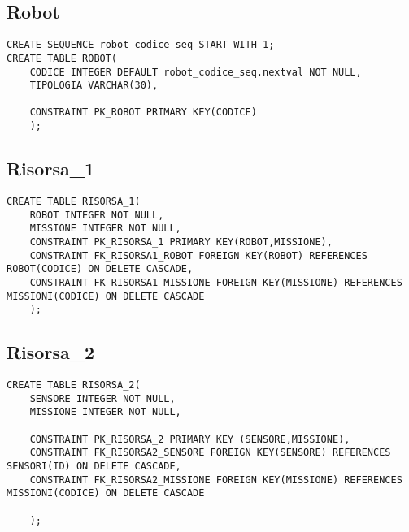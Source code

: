 \begin{description}
\subsection{Robot}
\begin{verbatim}
CREATE SEQUENCE robot_codice_seq START WITH 1;
CREATE TABLE ROBOT(
    CODICE INTEGER DEFAULT robot_codice_seq.nextval NOT NULL,
    TIPOLOGIA VARCHAR(30),
    
    CONSTRAINT PK_ROBOT PRIMARY KEY(CODICE)
    );
\end{verbatim}

\subsection{Risorsa_1}
\begin{verbatim}
CREATE TABLE RISORSA_1(
    ROBOT INTEGER NOT NULL,
    MISSIONE INTEGER NOT NULL,
    CONSTRAINT PK_RISORSA_1 PRIMARY KEY(ROBOT,MISSIONE),
    CONSTRAINT FK_RISORSA1_ROBOT FOREIGN KEY(ROBOT) REFERENCES ROBOT(CODICE) ON DELETE CASCADE, 
    CONSTRAINT FK_RISORSA1_MISSIONE FOREIGN KEY(MISSIONE) REFERENCES MISSIONI(CODICE) ON DELETE CASCADE
    );
\end{verbatim}

\subsection{Risorsa_2}
\begin{verbatim}
CREATE TABLE RISORSA_2(
    SENSORE INTEGER NOT NULL,
    MISSIONE INTEGER NOT NULL,
    
    CONSTRAINT PK_RISORSA_2 PRIMARY KEY (SENSORE,MISSIONE),
    CONSTRAINT FK_RISORSA2_SENSORE FOREIGN KEY(SENSORE) REFERENCES SENSORI(ID) ON DELETE CASCADE,
    CONSTRAINT FK_RISORSA2_MISSIONE FOREIGN KEY(MISSIONE) REFERENCES MISSIONI(CODICE) ON DELETE CASCADE
    
    );
\end{verbatim}
\end{description}


